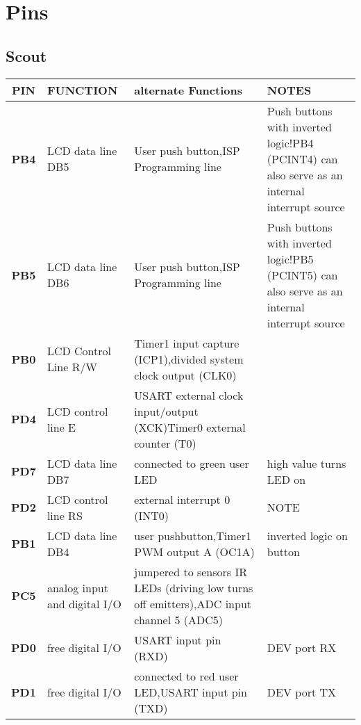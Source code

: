 \documentclass[12pt]{article}
\begin{document}
\lstset{language=C++}

\section*{Pins}

\subsection*{Scout}

\small
\begin{tabular}{c || p{30mm} | p{30mm} | p{60mm}}
  \hline
  \textbf{PIN} & FUNCTION & alternate Functions & NOTES\\
  \hline
  \hline
  \hline
  \textbf{PB4} & LCD data line DB5 & User push button,\newline ISP Programming line & Push buttons with inverted logic!\newline PB4 (PCINT4) can also serve as an internal interrupt source\\
  \hline
  \textbf{PB5} & LCD data line DB6 & User push button,\newline ISP Programming line & Push buttons with inverted logic!\newline PB5 (PCINT5) can also serve as an internal interrupt source\\
  \hline
  \textbf{PB0} & LCD Control Line R/W & Timer1 input capture (ICP1),\newline divided system clock output (CLK0) & \\
  \hline
  \textbf{PD4} & LCD control line E & USART external clock input/output (XCK)\newline Timer0 external counter (T0) & \\
  \hline
  \textbf{PD7} & LCD data line DB7 & connected to green user LED & high value turns LED on\\
  \hline
  \textbf{PD2} & LCD control line RS & external interrupt 0 (INT0) & NOTE\\
  \hline
  \textbf{PB1} & LCD data line DB4 & user pushbutton,\newline Timer1 PWM output A (OC1A) & inverted logic on button\\
  \hline
  \textbf{PC5} & analog input and digital I/O & jumpered to sensors IR LEDs (driving low turns off emitters),\newline ADC input channel 5 (ADC5) & \\
  \hline
  \textbf{PD0} & free digital I/O & USART input pin (RXD) & DEV port RX\\
  \hline
  \textbf{PD1} & free digital I/O & connected to red user LED,\newline USART input pin (TXD) & DEV port TX\\
  \hline
\end{tabular}
\normalsize
\end{document}
